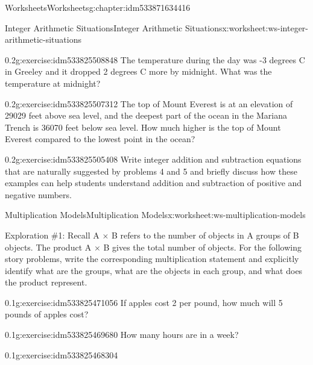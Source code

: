 \documentclass[twoside,11pt,]{book}
\begin{document}
\begin{chapterptx}{Worksheets}{}{Worksheets}{}{}{g:chapter:idm533871634416}
\begin{worksheet-section-numberless}{Integer Arithmetic Situations}{}{Integer Arithmetic Situations}{}{}{x:worksheet:ws-integer-arithmetic-situations}
\begin{divisionexercise}{4}{}{0.2}{g:exercise:idm533825508848}%
The temperature during the day was -3 degrees C in Greeley and it dropped 2 degrees C more by midnight. What was the temperature at midnight?%
\end{divisionexercise}%
\begin{divisionexercise}{5}{}{0.2}{g:exercise:idm533825507312}%
The top of Mount Everest is at an elevation of 29029 feet above sea level, and the deepest part of the ocean in the Mariana Trench is 36070 feet below sea level.  How much higher is the top of Mount Everest compared to the lowest point in the ocean?%
\end{divisionexercise}%
\clearpage
\begin{divisionexercise}{6}{}{0.2}{g:exercise:idm533825505408}%
Write integer addition and subtraction equations that are naturally suggested by problems 4 and 5 and briefly discuss how these examples can help students understand addition and subtraction of positive and negative numbers.%
\end{divisionexercise}%
\end{worksheet-section-numberless}
\restoregeometry
%
%
\typeout{************************************************}
\typeout{************************************************}
%
\begin{worksheet-section-numberless}{Multiplication Models}{}{Multiplication Models}{}{}{x:worksheet:ws-multiplication-models}
\begin{introduction}{}%
Exploration \#1: Recall A \(\times \) B refers to the number of objects in A groups of B objects.  The product A \(\times \) B gives the total number of objects.  For the following story problems, write the corresponding multiplication statement and explicitly identify what are the groups, what are the objects in each group, and what does the product represent.%
\end{introduction}%
\begin{divisionexercise}{1}{}{0.1}{g:exercise:idm533825471056}%
If apples cost \textdollar{}2 per pound, how much will 5 pounds of apples cost?%
\end{divisionexercise}%
\begin{divisionexercise}{2}{}{0.1}{g:exercise:idm533825469680}%
How many hours are in a week?%
\end{divisionexercise}%
\begin{divisionexercise}{3}{}{0.1}{g:exercise:idm533825468304}%

\end{divisionexercise}
\end{worksheet-section-numberless}
\end{chapterptx}
\end{document}
